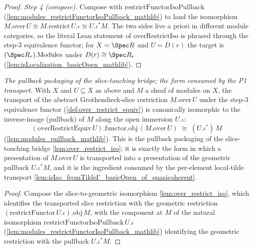 \begin{proof}
  \emph{Step 4 (compose).} Compose with
  \(\mathrm{restrictFunctorIsoPullback}\) (\cref{lem:modules_restrictFunctorIsoPullback_mathlib})
  to land the isomorphism \(M.\mathrm{over}\,U \cong M.\mathrm{restrict}\,U.\iota \cong
  U.\iota^{*}M\). The two sides live a priori in different module categories, so the literal Lean
  statement of \(\mathrm{overRestrictIso}\) is phrased through the step-3 equivalence functor; for
  \(X = \Spec R\) and \(U = D(r)\) the target is \((\Spec R_r).\mathrm{Modules}\) under
  \(D(r) \cong \Spec R_r\) (\cref{lem:isLocalization_basicOpen_mathlib}).
\end{proof}


\begin{lemma}\leanok
  \label{lem:over_restrict_pullback_iso}
  \textit{The pullback packaging of the slice-touching bridge; the form consumed by the P1 transport.}
  With \(X\) and \(U \subseteq X\) as above and \(M\) a sheaf of modules on \(X\), the transport of the
  abstract Grothendieck-slice restriction \(M.\mathrm{over}\,U\) under the step-3 equivalence functor
  (\cref{def:over_restrict_equiv}) is canonically isomorphic to the inverse-image (pullback) of \(M\)
  along the open immersion \(U.\iota\):
  \[
    (\mathrm{overRestrictEquiv}\,U).\mathrm{functor}.\mathrm{obj}\,(M.\mathrm{over}\,U)
      \;\cong\; (U.\iota^{*})\,M
  \]
  (\cref{lem:modules_pullback_mathlib}). This is the pullback packaging of the slice-touching bridge
  \cref{lem:over_restrict_iso}; it is exactly the form in which a presentation of
  \(M.\mathrm{over}\,U\) is transported into a presentation of the geometric pullback \(U.\iota^{*}M\),
  and it is the ingredient consumed by the per-element local-tilde transport
  \cref{lem:isIso_fromTildeΓ_basicOpen_of_quasicoherent}.
\end{lemma}
\begin{proof}
  Compose the slice-to-geometric isomorphism \cref{lem:over_restrict_iso}, which identifies the
  transported slice restriction with the geometric restriction
  \((\mathrm{restrictFunctor}\,U.\iota).\mathrm{obj}\,M\), with the component at \(M\) of the natural
  isomorphism \(\mathrm{restrictFunctorIsoPullback}\,U.\iota\)
  (\cref{lem:modules_restrictFunctorIsoPullback_mathlib}) identifying the geometric restriction with
  the pullback \(U.\iota^{*}M\).
\end{proof}

